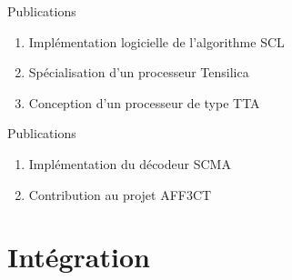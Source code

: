 \documentclass[t,compress,mathserif,12pt,xcolor=dvipsnames]{beamer}
\begin{document}
\begin{frame}[c]{Publications}

  \begin{enumerate}
\renewcommand{\section}[2]{} %

    \renewcommand*{\bibfont}{\scriptsize}
    \nocite{leonardon_fast_2017,leonardon_custom_2018,ghaffari_improving_2017,leonardon_tta_2018,Ghaffari2018,cassagne_fast_2017,cassagne_gdr_2017,leonardon_custom_2018}
    \vfill
    \item<+-> Implémentation logicielle de l'algorithme  SCL
    \scriptsize{\printbibliography[keyword={fast-scl}]}
    \vfill
    \item<+-> Spécialisation d'un processeur Tensilica
    \scriptsize{\printbibliography[keyword={tensilica}]}
    \vfill
    \item<+-> Conception d'un processeur de type TTA
    \scriptsize{\printbibliography[keyword={tta}]}
    \vfill
  \end{enumerate}

\end{frame}

\begin{frame}[c]{Publications}

  \begin{enumerate}
\renewcommand{\section}[2]{} %

    \renewcommand*{\bibfont}{\scriptsize}
    \nocite{leonardon_fast_2017,leonardon_custom_2018,ghaffari_improving_2017,leonardon_tta_2018,leonardon_tta_2019,Ghaffari2018,cassagne_fast_2017,cassagne_gdr_2017,cassagne2019aff3ct}
    \vfill
    \item<+-> Implémentation du décodeur SCMA
    \printbibliography[keyword={ghaffari}]
    \vfill
    \item<+-> Contribution au projet AFF3CT
    \printbibliography[keyword={aff3ct}]
    \vfill
  \end{enumerate}

\end{frame}





\section{Intégration}
\end{document}
